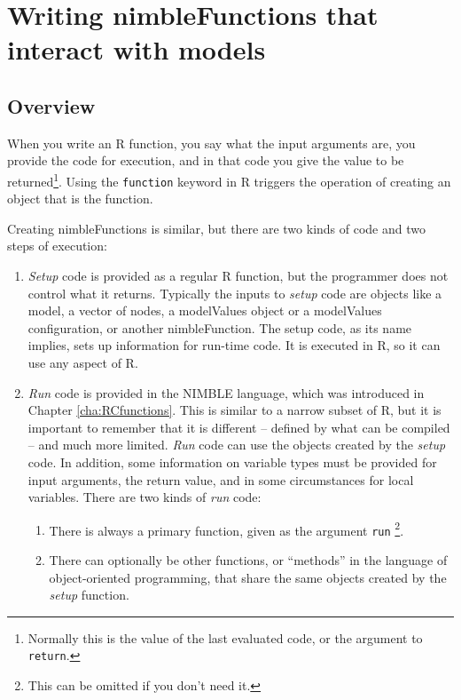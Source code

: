 \documentclass[12pt,oneside]{book}\usepackage[]{graphicx}\usepackage[]{color}
\def\cd#1{\texttt{#1}}
\def\nm#1{\textit{#1}}
\begin{document}





\chapter{Writing nimbleFunctions that interact with models}
\label{cha:progr-with-models}




  
\section{Overview}
\label{sec:writ-nimble-funct}

When you write an R function, you say what the input arguments are,
you provide the code for execution, and in that code you give the
value to be returned\footnote{Normally this is the value of the last
  evaluated code, or the argument to \cd{return}.}.  Using the
\cd{function} keyword in R triggers the operation of
creating an object that is the function.

Creating nimbleFunctions is similar, but there
are two kinds of code and two steps of execution:

\begin{enumerate}
\item \nm{Setup} code is provided as a regular R function, but the
  programmer does not control what it returns.  Typically the inputs to
  \nm{setup} code are objects like a model, a vector of nodes,
  a modelValues object or a modelValues configuration, or another nimbleFunction.  The setup code,
  as its name implies, sets up information for run-time code.  It is
  executed in R, so it can use any aspect of R.
\item \nm{Run} code is provided in the NIMBLE language, which was
  introduced in Chapter \ref{cha:RCfunctions}.  This is
  similar to a narrow subset of R, but it is important to remember
  that it is different -- defined by what can be compiled -- and much more limited.  \nm{Run} code can
  use the objects created by the \nm{setup} code.  In addition,
  some information on variable types must be provided for input
  arguments, the return value, and in some circumstances for local
  variables. There are two
  kinds of \nm{run} code:
  \begin{enumerate}
  \item There is always a primary function, given as the argument \cd{run}
    \footnote{This can be omitted if you don't need it.}.
  \item There can optionally be other functions, or ``methods'' in the
    language of object-oriented programming, that share the same
    objects created by the \nm{setup} function.
  \end{enumerate}
\end{enumerate}
\end{document}
